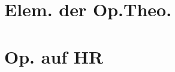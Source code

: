 \documentclass[a7paper,11pt,print,grid=front]{kartei}
\begin{document}
	
	\section*{Elem. der Op.Theo.}	
		
		
		
	\section*{Op. auf HR} 
			
			
		
				
			
\end{document}
